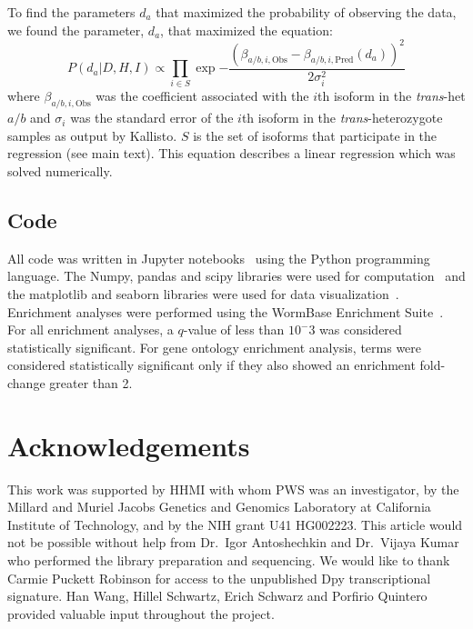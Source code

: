 \documentclass[10pt, twocolumn]{article}
\begin{document}
To find the parameters $d_a$ that maximized the probability of observing the
data, we found the parameter, $d_a$, that maximized the equation:
\begin{equation}
    P(d_a|D,H,I) \propto \prod_{i \in S}
                   \exp{-\frac{{(\beta_{a/b,i,\text{Obs}} -
                                \beta_{a/b,i,\text{Pred}}(d_a))}^2}{
                                2\sigma_i^2}}
\end{equation}
where $\beta_{a/b,i,\text{Obs}}$ was the coefficient associated with the $i$th
isoform in the \emph{trans}-het $a/b$ and $\sigma_i$ was the standard error of
the $i$th isoform in the \emph{trans}-heterozygote samples as output by
Kallisto. $S$ is the set of isoforms that participate in the regression (see
main text). This equation describes a linear regression which was solved
numerically.

\subsection*{Code}
All code was written in Jupyter notebooks~\cite{Perez2007} using the Python
programming language. The Numpy, pandas and scipy libraries were used for
computation~\cite{VanDerWalt2011,McKinney2011,Oliphant2007} and the matplotlib
and seaborn libraries were used for data visualization~\cite{Hunter2007,Waskom}.
Enrichment analyses were performed using the WormBase Enrichment
Suite~\cite{Angeles-Albores2016}. For all enrichment analyses, a $q$-value of
less than $10^-3$ was considered statistically significant. For gene ontology
enrichment analysis, terms were considered statistically significant only if
they also showed an enrichment fold-change greater than 2.

\section*{Acknowledgements}
This work was supported by HHMI with whom PWS was an investigator, by the
Millard and Muriel Jacobs Genetics and Genomics Laboratory at California
Institute of Technology, and by the NIH grant U41 HG002223. This article
would not be possible without help from Dr.\ Igor Antoshechkin and Dr.\ Vijaya
Kumar who performed the library preparation and sequencing. We would like to
thank Carmie Puckett Robinson for access to the unpublished Dpy transcriptional
signature. Han Wang, Hillel Schwartz, Erich Schwarz and Porfirio Quintero
provided valuable input throughout the project.



\end{document}
